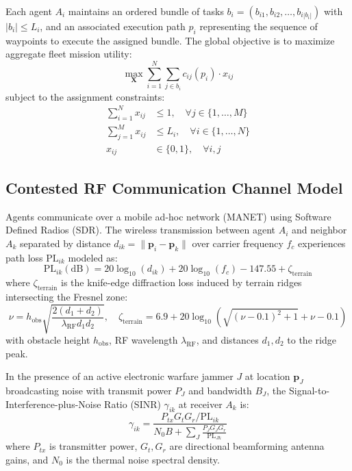 \documentclass[journal,10pt,twocolumn]{IEEEtran}
\begin{document}
Each agent $A_i$ maintains an ordered bundle of tasks $b_i = (b_{i1}, b_{i2}, \dots, b_{i|b_i|})$ with $|b_i| \le L_i$, and an associated execution path $p_i$ representing the sequence of waypoints to execute the assigned bundle. The global objective is to maximize aggregate fleet mission utility:
\begin{equation}
\max_{\mathbf{X}} \sum_{i=1}^{N} \sum_{j \in b_i} c_{ij}(p_i) \cdot x_{ij}
\label{eq:global_obj}
\end{equation}
subject to the assignment constraints:
\begin{align}
\sum_{i=1}^{N} x_{ij} &\le 1, \quad \forall j \in \{1, \dots, M\} \label{eq:c1} \\
\sum_{j=1}^{M} x_{ij} &\le L_i, \quad \forall i \in \{1, \dots, N\} \label{eq:c2} \\
x_{ij} &\in \{0, 1\}, \quad \forall i, j \label{eq:c3}
\end{align}

\subsection{Contested RF Communication Channel Model}
Agents communicate over a mobile ad-hoc network (MANET) using Software Defined Radios (SDR). The wireless transmission between agent $A_i$ and neighbor $A_k$ separated by distance $d_{ik} = \|\mathbf{p}_i - \mathbf{p}_k\|$ over carrier frequency $f_c$ experiences path loss $\text{PL}_{ik}$ modeled as:
\begin{equation}
\text{PL}_{ik}(\text{dB}) = 20 \log_{10}(d_{ik}) + 20 \log_{10}(f_c) - 147.55 + \zeta_{\text{terrain}}
\end{equation}
where $\zeta_{\text{terrain}}$ is the knife-edge diffraction loss induced by terrain ridges intersecting the Fresnel zone:
\begin{equation}
\nu = h_{\text{obs}} \sqrt{\frac{2 (d_1 + d_2)}{\lambda_{\text{RF}} d_1 d_2}}, \quad \zeta_{\text{terrain}} = 6.9 + 20 \log_{10}\left(\sqrt{(\nu - 0.1)^2 + 1} + \nu - 0.1\right)
\end{equation}
with obstacle height $h_{\text{obs}}$, RF wavelength $\lambda_{\text{RF}}$, and distances $d_1, d_2$ to the ridge peak.

In the presence of an active electronic warfare jammer $J$ at location $\mathbf{p}_J$ broadcasting noise with transmit power $P_J$ and bandwidth $B_J$, the Signal-to-Interference-plus-Noise Ratio (SINR) $\gamma_{ik}$ at receiver $A_k$ is:
\begin{equation}
\gamma_{ik} = \frac{P_{tx} G_t G_r / \text{PL}_{ik}}{N_0 B + \sum_{J} \frac{P_J G_J G_r}{\text{PL}_{Jk}}}
\end{equation}
where $P_{tx}$ is transmitter power, $G_t, G_r$ are directional beamforming antenna gains, and $N_0$ is the thermal noise spectral density.
\end{document}
